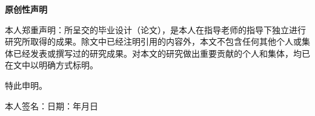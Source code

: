 %
%
%
%
%


\pagestyle{originality}
\topskip=0pt

\newcommand{\circled}[2][]{\tikz[baseline=(char.base)]
  {\node[shape = circle, draw, inner sep = 1pt]
  (char) {\phantom{\ifblank{#1}{#2}{#1}}};
  \node at (char.center) {\makebox[0pt][c]{#2}};}}
\robustify{\circled}

\setlength{\parskip}{0.4em}
\renewcommand{\baselinestretch}{1.41}

\vspace*{-6mm}

\begin{center}
  \heiti{}\textbf{原创性声明}
\end{center}


本人郑重声明：所呈交的毕业设计（论文），是本人在指导老师的指导下独立进行研究所取得的成果。除文中已经注明引用的内容外，本文不包含任何其他个人或集体已经发表或撰写过的研究成果。对本文的研究做出重要贡献的个人和集体，均已在文中以明确方式标明。

特此申明。

\vspace{13mm}

\begin{flushright}
  本人签名：\hspace{40mm}日\hspace{2.5mm}期：\hspace{13mm}年\hspace{8mm}月\hspace{8mm}日
\end{flushright}

